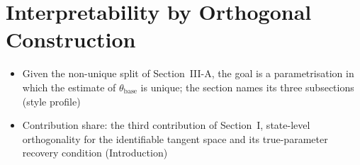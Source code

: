 \section{Interpretability by Orthogonal Construction}\label{sec:obc}
\ifdraft
\begin{itemize}
\item Given the non-unique split of Section~III-A, the goal is a parametrisation in which the estimate of $\theta_{\mathrm{base}}$ is unique; the section names its three subsections (style profile)
\item Contribution share: the third contribution of Section~I, state-level orthogonality for the identifiable tangent space and its true-parameter recovery condition (Introduction)
\end{itemize}
\fi

